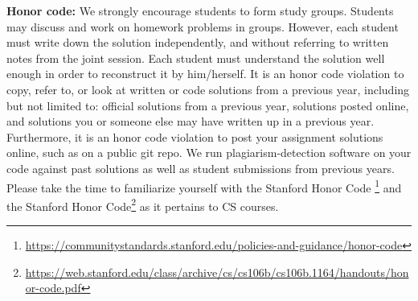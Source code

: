 \documentclass{article}
\begin{document}
{\bf Honor code:} 
We strongly encourage students to form study groups. Students may discuss and work on homework problems in groups. However, each student must write down the solution independently, and without referring to written notes from the joint session. Each student must understand the solution well enough in order to reconstruct it by him/herself. It is an honor code violation to copy, refer to, or look at written or code solutions from a previous year, including but not limited to: official solutions from a previous year, solutions posted online, and solutions you or someone else may have written up in a previous year. Furthermore, it is an honor code violation to post your assignment solutions online, such as on a public git repo. We run plagiarism-detection software on your code against past solutions as well as student submissions from previous years. Please take the time to familiarize yourself with the Stanford Honor Code 
\footnote{\url{https://communitystandards.stanford.edu/policies-and-guidance/honor-code}} and the Stanford Honor Code\footnote{\url{https://web.stanford.edu/class/archive/cs/cs106b/cs106b.1164/handouts/honor-code.pdf}} as it pertains to CS courses.

\begin{enumerate}[1.]
\newpage

\newpage

\newpage

\end{enumerate}
\end{document}
